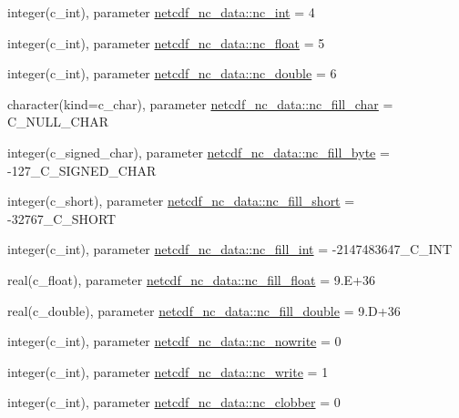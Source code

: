 \begin{DoxyCompactItemize}
\item 
integer(c\+\_\+int), parameter \hyperlink{namespacenetcdf__nc__data_ace0e95a04f7e62638aeb03fd25aebf16}{netcdf\+\_\+nc\+\_\+data\+::nc\+\_\+int} = 4
\item 
integer(c\+\_\+int), parameter \hyperlink{namespacenetcdf__nc__data_ac5ea238705a0ae9d07ec00344189ef94}{netcdf\+\_\+nc\+\_\+data\+::nc\+\_\+float} = 5
\item 
integer(c\+\_\+int), parameter \hyperlink{namespacenetcdf__nc__data_ac0744e496a8eb335472d194685557cce}{netcdf\+\_\+nc\+\_\+data\+::nc\+\_\+double} = 6
\item 
character(kind=c\+\_\+char), parameter \hyperlink{namespacenetcdf__nc__data_a6515514ae08e26a43c055e0c08db36f7}{netcdf\+\_\+nc\+\_\+data\+::nc\+\_\+fill\+\_\+char} = C\+\_\+\+N\+U\+L\+L\+\_\+\+C\+H\+AR
\item 
integer(c\+\_\+signed\+\_\+char), parameter \hyperlink{namespacenetcdf__nc__data_a17bcf94931f569f0f454653d0971b1d4}{netcdf\+\_\+nc\+\_\+data\+::nc\+\_\+fill\+\_\+byte} = -\/127\+\_\+\+C\+\_\+\+S\+I\+G\+N\+E\+D\+\_\+\+C\+H\+AR
\item 
integer(c\+\_\+short), parameter \hyperlink{namespacenetcdf__nc__data_a302781a8122b18c35e60d06913c8727b}{netcdf\+\_\+nc\+\_\+data\+::nc\+\_\+fill\+\_\+short} = -\/32767\+\_\+\+C\+\_\+\+S\+H\+O\+RT
\item 
integer(c\+\_\+int), parameter \hyperlink{namespacenetcdf__nc__data_ac115ad613c2ed51ca507d2e54412409d}{netcdf\+\_\+nc\+\_\+data\+::nc\+\_\+fill\+\_\+int} = -\/2147483647\+\_\+\+C\+\_\+\+I\+NT
\item 
real(c\+\_\+float), parameter \hyperlink{namespacenetcdf__nc__data_a5c70156320c1a2a738e211e51addee1b}{netcdf\+\_\+nc\+\_\+data\+::nc\+\_\+fill\+\_\+float} = 9.\+E+36
\item 
real(c\+\_\+double), parameter \hyperlink{namespacenetcdf__nc__data_a60cf4a756a12609a3c7f3dcbf3caf7be}{netcdf\+\_\+nc\+\_\+data\+::nc\+\_\+fill\+\_\+double} = 9.\+D+36
\item 
integer(c\+\_\+int), parameter \hyperlink{namespacenetcdf__nc__data_a5364e0c29c2d0746fd8188821cf38549}{netcdf\+\_\+nc\+\_\+data\+::nc\+\_\+nowrite} = 0
\item 
integer(c\+\_\+int), parameter \hyperlink{namespacenetcdf__nc__data_a72f6e9d6581d369c69a281e9480455dd}{netcdf\+\_\+nc\+\_\+data\+::nc\+\_\+write} = 1
\item 
integer(c\+\_\+int), parameter \hyperlink{namespacenetcdf__nc__data_a025f363aa29ed983ae25be4a9c9fcc28}{netcdf\+\_\+nc\+\_\+data\+::nc\+\_\+clobber} = 0

\end{DoxyCompactItemize}
